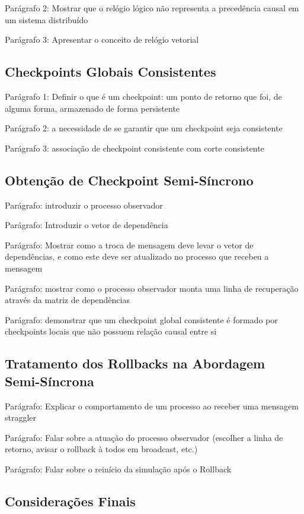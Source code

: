Parágrafo 2: Mostrar que o relógio lógico não representa a precedência causal em um sistema distribuído

Parágrafo 3: Apresentar o conceito de relógio vetorial

\subsection{Checkpoints Globais Consistentes}

Parágrafo 1: Definir o que é um checkpoint: um ponto de retorno que foi, de alguma forma, armazenado de forma persistente

Parágrafo 2: a necessidade de se garantir que um checkpoint seja consistente

Parágrafo 3: associação de checkpoint consistente com corte consistente

\subsection{Obtenção de Checkpoint Semi-Síncrono}

Parágrafo: introduzir o processo observador

Parágrafo: Introduzir o vetor de dependência

Parágrafo: Mostrar como a troca de mensagem deve levar o vetor de dependências, e como este deve ser atualizado no processo que recebeu a mensagem

Parágrafo: mostrar como o processo observador monta uma linha de recuperação através da matriz de dependências

Parágrafo: demonstrar que um checkpoint global consistente é formado por checkpoints locais que não possuem relação causal entre si


\subsection{Tratamento dos Rollbacks na Abordagem Semi-Síncrona}

Parágrafo: Explicar o comportamento de um processo ao receber uma mensagem straggler 

Parágrafo: Falar sobre a atuação do processo observador (escolher a linha de retorno, avisar o rollback à todos em broadcast, etc.)

Parágrafo: Falar sobre o reinício da simulação após o Rollback

\subsection{Considerações Finais}


